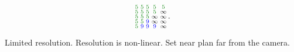\begin{compactdesc}
\begin{gather*}
\begin{smallmatrix}
					\textcolor{black!50!green}{5}&\textcolor{black!50!green}{5}&\textcolor{black!50!green}{5}&\textcolor{black!50!green}{5}&\textcolor{black!50!green}{5}\\
					\textcolor{black!50!green}{5}&\textcolor{black!50!green}{5}&\textcolor{black!50!green}{5}&\textcolor{black!50!green}{5}&\infty\\
					\textcolor{black!50!green}{5}&\textcolor{black!50!green}{5}&\textcolor{black!50!green}{5}&\infty&\infty\\
					\textcolor{black!50!green}{5}&\textcolor{black!50!green}{5}&\textcolor{blue}{9}&\infty&\infty\\
					\textcolor{black!50!green}{5}&\textcolor{blue}{9}&\textcolor{blue}{9}&\textcolor{blue}{9}&\infty
				\end{smallmatrix}.
			\end{gather*}
		\item[\lp{Problem}] Limited resolution. Resolution is non-linear. Set near plan far from the camera.
\end{compactdesc}
